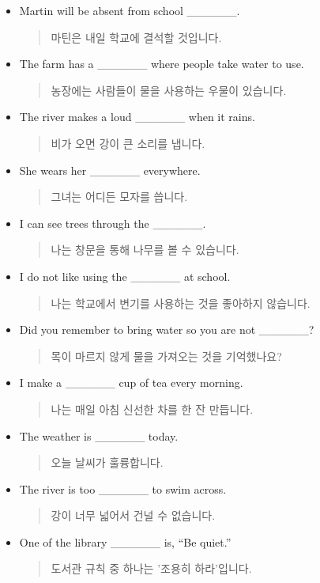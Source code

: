 \documentclass{article}
\begin{document}
\begin{addmargin}[1em]{1em}
\begin{itemize}
\begin{quote}
    \end{quote}
    \item Martin will be absent from school \_\_\_\_\_\_.
    \begin{quote}
    마틴은 내일 학교에 결석할 것입니다.
    \end{quote}
    \item The farm has a \_\_\_\_\_\_ where people take water to use.
    \begin{quote}
    농장에는 사람들이 물을 사용하는 우물이 있습니다.
    \end{quote}
    \item The river makes a loud \_\_\_\_\_\_ when it rains.
    \begin{quote}
    비가 오면 강이 큰 소리를 냅니다.
    \end{quote}
    \item She wears her \_\_\_\_\_\_ everywhere.
    \begin{quote}
    그녀는 어디든 모자를 씁니다.
    \end{quote}
    \newpage
    \item I can see trees through the \_\_\_\_\_\_.
    \begin{quote}
    나는 창문을 통해 나무를 볼 수 있습니다.
    \end{quote}
    \item I do not like using the \_\_\_\_\_\_ at school.
    \begin{quote}
    나는 학교에서 변기를 사용하는 것을 좋아하지 않습니다.
    \end{quote}
    \item Did you remember to bring water so you are not \_\_\_\_\_\_?
    \begin{quote}
    목이 마르지 않게 물을 가져오는 것을 기억했나요?
    \end{quote}
    \item I make a \_\_\_\_\_\_ cup of tea every morning.
    \begin{quote}
    나는 매일 아침 신선한 차를 한 잔 만듭니다.
    \end{quote}
    \item The weather is \_\_\_\_\_\_ today.
    \begin{quote}
    오늘 날씨가 훌륭합니다.
    \end{quote}
    \item The river is too \_\_\_\_\_\_ to swim across.
    \begin{quote}
    강이 너무 넓어서 건널 수 없습니다.
    \end{quote}
    \item One of the library \_\_\_\_\_\_ is, ``Be quiet.''
    \begin{quote}
    도서관 규칙 중 하나는 '조용히 하라'입니다.
    \end{quote}
\end{itemize}
\end{addmargin}
\newpage
\end{document}
